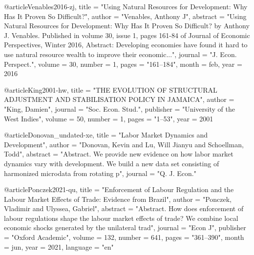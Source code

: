 @article{Venables2016-zj,
	title    = "Using Natural Resources for Development: Why Has It Proven So
	Difficult?",
	author   = "Venables, Anthony J",
	abstract = "Using Natural Resources for Development: Why Has It Proven So
	Difficult? by Anthony J. Venables. Published in volume 30, issue
	1, pages 161-84 of Journal of Economic Perspectives, Winter 2016,
	Abstract: Developing economies have found it hard to use natural
	resource wealth to improve their economic...",
	journal  = "J. Econ. Perspect.",
	volume   =  30,
	number   =  1,
	pages    = "161--184",
	month    =  feb,
	year     =  2016
}

@article{King2001-hw,
	title     = "THE EVOLUTION OF STRUCTURAL ADJUSTMENT AND
	STABILISATION POLICY IN JAMAICA",
	author    = "King, Damien",
	journal   = "Soc. Econ. Stud.",
	publisher = "University of the West Indies",
	volume    =  50,
	number    =  1,
	pages     = "1--53",
	year      =  2001
}

@article{Donovan_undated-xe,
	title    = "Labor Market Dynamics and Development",
	author   = "Donovan, Kevin and Lu, Will Jianyu and Schoellman, Todd",
	abstract = "Abstract. We provide new evidence on how labor market dynamics
	vary with development. We build a new data set consisting of
	harmonized microdata from rotating p",
	journal  = "Q. J. Econ."
}


@article{Ponczek2021-qu,
	title     = "Enforcement of Labour Regulation and the Labour Market Effects
	of Trade: Evidence from Brazil",
	author    = "Ponczek, Vladimir and Ulyssea, Gabriel",
	abstract  = "Abstract. How does enforcement of labour regulations shape the
	labour market effects of trade? We combine local economic shocks
	generated by the unilateral trad",
	journal   = "Econ J",
	publisher = "Oxford Academic",
	volume    =  132,
	number    =  641,
	pages     = "361--390",
	month     =  jun,
	year      =  2021,
	language  = "en"
}










